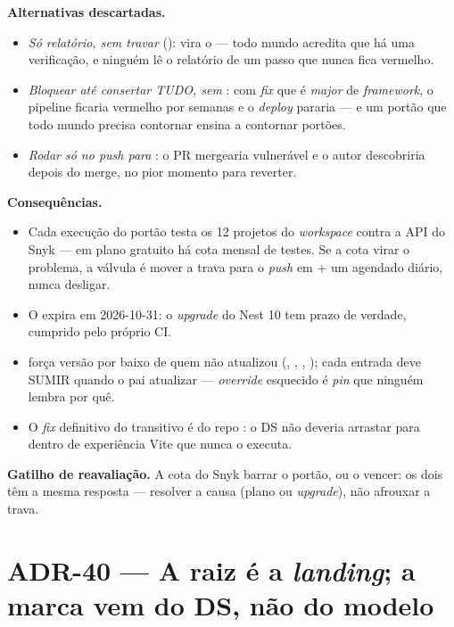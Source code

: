 \textbf{Alternativas descartadas.}
\begin{itemize}
  \item \emph{Só relatório, sem travar} (): vira o
     --- todo mundo acredita que há uma verificação, e ninguém
    lê o relatório de um passo que nunca fica vermelho.
  \item \emph{Bloquear até consertar TUDO, sem }: com \emph{fix} que
    é \emph{major} de \emph{framework}, o pipeline ficaria vermelho por semanas
    e o \emph{deploy} pararia --- e um portão que todo mundo precisa contornar
    ensina a contornar portões.
  \item \emph{Rodar só no push para }: o PR mergearia vulnerável e o
    autor descobriria depois do merge, no pior momento para reverter.
\end{itemize}

\textbf{Consequências.}
\begin{itemize}
  \item Cada execução do portão testa os 12 projetos do \emph{workspace} contra
    a API do Snyk --- em plano gratuito há cota mensal de testes. Se a cota
    virar o problema, a válvula é mover a trava para o \emph{push} em
     + um agendado diário, nunca desligar.
  \item O  expira em 2026-10-31: o \emph{upgrade} do Nest 10
    tem prazo de verdade, cumprido pelo próprio CI.
  \item {} força versão por baixo de quem não atualizou
    (, , , );
    cada entrada deve SUMIR quando o pai atualizar --- \emph{override} esquecido
    é \emph{pin} que ninguém lembra por quê.
  \item O \emph{fix} definitivo do  transitivo é do repo
    : o DS não deveria arrastar  para dentro de
    experiência Vite que nunca o executa.
\end{itemize}

\textbf{Gatilho de reavaliação.} A cota do Snyk barrar o portão, ou o
 vencer: os dois têm a mesma resposta --- resolver a causa (plano ou
\emph{upgrade}), não afrouxar a trava.

\section{ADR-40 --- A raiz é a \emph{landing}; a marca vem do DS, não do modelo}
\label{adr:landing}

